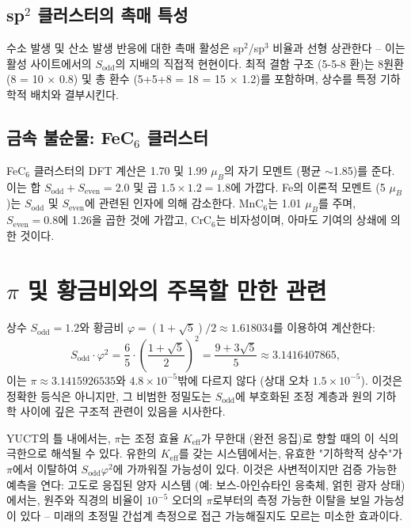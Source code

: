 \documentclass[11pt,a4paper]{article}
\begin{document}
	\subsection{sp\({}^2\) 클러스터의 촉매 특성}
	수소 발생 및 산소 발생 반응에 대한 촉매 활성은 sp\({}^2\)/sp\({}^3\) 비율과 선형 상관한다 -- 이는 활성 사이트에서의 \(S_{\text{odd}}\)의 지배의 직접적 현현이다. 최적 결함 구조 (5-5-8 환)는 8원환 (8 = 10 \(\times\) 0.8) 및 총 환수 (5+5+8 = 18 = 15 \(\times\) 1.2)를 포함하며, 상수를 특정 기하학적 배치와 결부시킨다.
	
	\subsection{금속 불순물: FeC\({}_6\) 클러스터}
	FeC\({}_6\) 클러스터의 DFT 계산은 1.70 및 1.99 \(\mu_B\)의 자기 모멘트 (평균 \(\sim\)1.85)를 준다. 이는 합 \(S_{\text{odd}}+S_{\text{even}}=2.0\) 및 곱 \(1.5\times1.2=1.8\)에 가깝다. Fe의 이론적 모멘트 (5 \(\mu_B\))는 \(S_{\text{odd}}\) 및 \(S_{\text{even}}\)에 관련된 인자에 의해 감소한다. MnC\({}_6\)는 1.01 \(\mu_B\)를 주며, \(S_{\text{even}}=0.8\)에 1.26을 곱한 것에 가깝고, CrC\({}_6\)는 비자성이며, 아마도 기여의 상쇄에 의한 것이다.
	
	\section{\(\pi\) 및 황금비와의 주목할 만한 관련}
	\label{sec:pi_relation}
	
	상수 \(S_{\text{odd}} = 1.2\)와 황금비 \(\varphi = (1+\sqrt{5})/2 \approx 1.618034\)를 이용하여 계산한다:
	\[
	S_{\text{odd}} \cdot \varphi^2 = \frac{6}{5} \cdot \left(\frac{1+\sqrt{5}}{2}\right)^2 = \frac{9+3\sqrt{5}}{5} \approx 3.1416407865,
	\]
	이는 \(\pi \approx 3.1415926535\)와 \(4.8\times10^{-5}\)밖에 다르지 않다 (상대 오차 \(1.5\times10^{-5}\)). 이것은 정확한 등식은 아니지만, 그 비범한 정밀도는 \(S_{\text{odd}}\)에 부호화된 조정 계층과 원의 기하학 사이에 깊은 구조적 관련이 있음을 시사한다.
	
	YUCT의 틀 내에서는, \(\pi\)는 조정 효율 \(K_{\text{eff}}\)가 무한대 (완전 응집)로 향할 때의 이 식의 극한으로 해석될 수 있다. 유한의 \(K_{\text{eff}}\)를 갖는 시스템에서는, 유효한 "기하학적 상수"가 \(\pi\)에서 이탈하여 \(S_{\text{odd}}\varphi^2\)에 가까워질 가능성이 있다. 이것은 사변적이지만 검증 가능한 예측을 연다: 고도로 응집된 양자 시스템 (예: 보스-아인슈타인 응축체, 얽힌 광자 상태)에서는, 원주와 직경의 비율이 \(10^{-5}\) 오더의 \(\pi\)로부터의 측정 가능한 이탈을 보일 가능성이 있다 -- 미래의 초정밀 간섭계 측정으로 접근 가능해질지도 모르는 미소한 효과이다.
	
\end{document}
